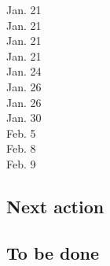 \documentclass[10pt,letterpaper]{article}
\begin{document}


\begin{description}
\item [Jan. 21]
\item [Jan. 21]
\item [Jan. 21] 
\item [Jan. 21] 
\item [Jan. 24] 
\item [Jan. 26]
\item [Jan. 26]
\item [Jan. 30] 
\item [Feb. 5] 
\item [Feb. 8]
\item [Feb. 9]
\end{description}

\subsection{Next action}
\label{sub:next}




\subsection{To be done}
\label{sub:to-do}
\end{document}
